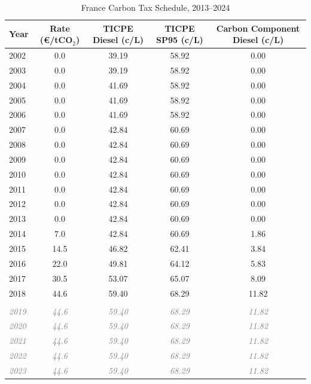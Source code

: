 \begin{table}[!h]
\centering
\caption{France Carbon Tax Schedule, 2013--2024}
\centering
\fontsize{10}{12}\selectfont
\begin{threeparttable}
\begin{tabular}[t]{lcccc}
\toprule
Year & Rate (\euro/tCO$_2$) & TICPE Diesel (c/L) & TICPE SP95 (c/L) & Carbon Component Diesel (c/L)\\
\midrule
2002 & 0.0 & 39.19 & 58.92 & 0.00\\
2003 & 0.0 & 39.19 & 58.92 & 0.00\\
2004 & 0.0 & 41.69 & 58.92 & 0.00\\
2005 & 0.0 & 41.69 & 58.92 & 0.00\\
2006 & 0.0 & 41.69 & 58.92 & 0.00\\
2007 & 0.0 & 42.84 & 60.69 & 0.00\\
2008 & 0.0 & 42.84 & 60.69 & 0.00\\
2009 & 0.0 & 42.84 & 60.69 & 0.00\\
2010 & 0.0 & 42.84 & 60.69 & 0.00\\
2011 & 0.0 & 42.84 & 60.69 & 0.00\\
2012 & 0.0 & 42.84 & 60.69 & 0.00\\
2013 & 0.0 & 42.84 & 60.69 & 0.00\\
2014 & 7.0 & 42.84 & 60.69 & 1.86\\
2015 & 14.5 & 46.82 & 62.41 & 3.84\\
2016 & 22.0 & 49.81 & 64.12 & 5.83\\
2017 & 30.5 & 53.07 & 65.07 & 8.09\\
2018 & 44.6 & 59.40 & 68.29 & 11.82\\
\midrule\\
\textcolor{gray}{\em{2019}} & \textcolor{gray}{\em{44.6}} & \textcolor{gray}{\em{59.40}} & \textcolor{gray}{\em{68.29}} & \textcolor{gray}{\em{11.82}}\\
\textcolor{gray}{\em{2020}} & \textcolor{gray}{\em{44.6}} & \textcolor{gray}{\em{59.40}} & \textcolor{gray}{\em{68.29}} & \textcolor{gray}{\em{11.82}}\\
\textcolor{gray}{\em{2021}} & \textcolor{gray}{\em{44.6}} & \textcolor{gray}{\em{59.40}} & \textcolor{gray}{\em{68.29}} & \textcolor{gray}{\em{11.82}}\\
\textcolor{gray}{\em{2022}} & \textcolor{gray}{\em{44.6}} & \textcolor{gray}{\em{59.40}} & \textcolor{gray}{\em{68.29}} & \textcolor{gray}{\em{11.82}}\\
\textcolor{gray}{\em{2023}} & \textcolor{gray}{\em{44.6}} & \textcolor{gray}{\em{59.40}} & \textcolor{gray}{\em{68.29}} & \textcolor{gray}{\em{11.82}}\\

\end{tabular}
\end{threeparttable}
\end{table}

